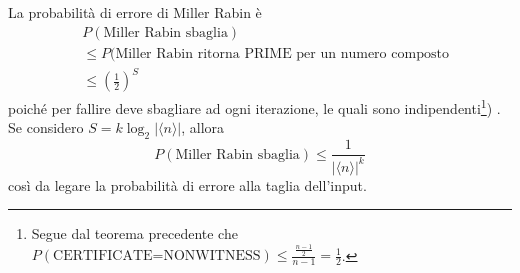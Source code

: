 La probabilità di errore di Miller Rabin è
\begin{align*}
&P(\text{Miller Rabin sbaglia}) \\
&\leq P(\text{Miller Rabin ritorna PRIME per un numero composto} \\
&\leq \left(\frac{1}{2}\right)^S
\end{align*}
poiché per fallire deve sbagliare ad ogni iterazione, le quali sono indipendenti\footnote{Segue dal teorema precedente che $P(\text{CERTIFICATE=NONWITNESS}) \leq \frac{\frac{n-1}{2}}{n-1} = \frac{1}{2}$.})	.
Se considero $S=k\log_2 |\langle n\rangle|$, allora
\[
P(\text{Miller Rabin sbaglia}) \leq \frac{1}{|\langle n\rangle|^k}
\]
così da legare la probabilità di errore alla taglia dell'input.